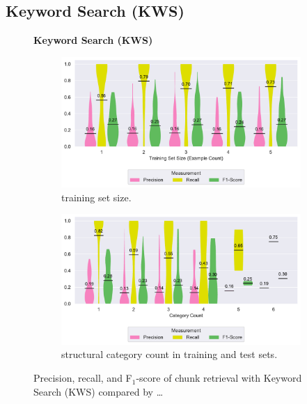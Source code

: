 \subsection{Keyword Search (KWS)}
\label{sec:r:kws}
\begin{figure}
\centering
    \textbf{Keyword Search (KWS)}\par\medskip
\begin{subfigure}[b]{\columnwidth}
		\centering
		\includegraphics[width=\columnwidth,
		clip]{img/big-study/recall-precision-examplecount-KWS.pdf}
		\caption{training set size.}
		\label{fig:recall-precision-examplecount-KWS}
\end{subfigure}\hspace{\fill}
\begin{subfigure}[b]{\columnwidth}
		\centering
		\includegraphics[width=\columnwidth,
		clip]{img/big-study/recall-precision-categorycount-KWS.pdf}
		\caption{structural category count
		in training and test sets.}
		\label{fig:recall-precision-categorycount-KWS}
\end{subfigure}
\caption{Precision, recall, and F$_{1}$-score of chunk retrieval with
Keyword Search (KWS) compared by \ldots}
\end{figure}



